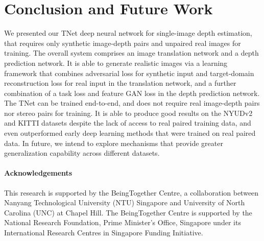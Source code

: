 \documentclass[runningheads]{llncs}
\begin{document}
\section{Conclusion and Future Work}

We presented our TNet deep neural network for single-image depth estimation, that requires only synthetic image-depth pairs and unpaired real images for training. The overall system comprises an image translation network and a depth prediction network. It is able to generate realistic images via a learning framework that combines adversarial loss for synthetic input and target-domain reconstruction loss for real input in the translation network, and a further combination of a task loss and feature GAN loss in the depth prediction network. The TNet can be trained end-to-end, and does not require real image-depth pairs nor stereo pairs for training. It is able to produce good results on the NYUDv2 and KITTI datasets despite the lack of access to real paired training data, and even outperformed early deep learning methods that were trained on real paired data. In future, we intend to explore mechanisms that provide greater generalization capability across different datasets.

\paragraph{\bf Acknowledgements} This research is supported by the BeingTogether Centre, a collaboration between Nanyang Technological University (NTU) Singapore and University of North Carolina (UNC) at Chapel Hill. The BeingTogether Centre is supported by the National Research Foundation, Prime Minister’s Office, Singapore under its International Research Centres in Singapore Funding Initiative.

\clearpage



\end{document}
